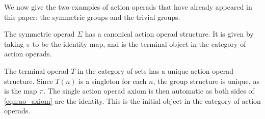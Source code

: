 We now give the two examples of action operads that have already appeared in this paper: the symmetric groups and the trivial groups.

\begin{example}\label{example:aop-sym}
The symmetric operad $\Sigma$ has a canonical action operad structure. It is given by taking $\pi$ to be the identity map, and is the terminal object in the category of action operads.
\end{example}

\begin{example}\label{example:aop-triv}
The terminal operad $T$ in the category of sets has a unique action operad structure. Since $T(n)$ is a singleton for each $n$, the group structure is unique, as is the map $\pi$. The single action operad axiom is then automatic as both sides of \cref{eqn:ao_axiom} are the identity. This is the initial object in the category of action operads.
\end{example}

